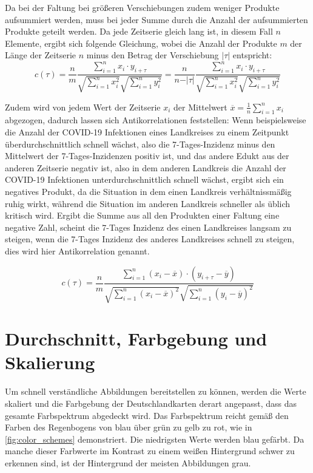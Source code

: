 Da bei der Faltung bei größeren Verschiebungen zudem weniger Produkte aufsummiert werden, muss bei jeder Summe durch die Anzahl der aufsummierten Produkte geteilt werden. Da jede Zeitserie gleich lang ist, in diesem Fall $n$ Elemente, ergibt sich folgende Gleichung, wobei die Anzahl der Produkte $m$ der Länge der Zeitserie $n$ minus den Betrag der Verschiebung $\vert\tau\vert$ entspricht:
\begin{equation}\label{eq:Korrelation}
    c(\tau) =\frac{n}{m} \frac{\sum_{i=1}^n x_i\cdot y_{i+\tau}}{\sqrt{\sum_{i=1}^n x_i^2}\sqrt{\sum_{i=1}^n y_i^2}}=
    \frac{n}{n-\vert\tau\vert} \frac{\sum_{i=1}^n x_i\cdot y_{i+\tau}}{\sqrt{\sum_{i=1}^n x_i^2}\sqrt{\sum_{i=1}^n y_i^2}}
\end{equation}

Zudem wird von jedem Wert der Zeitserie $x_i$ der Mittelwert $\overline x = \frac{1}{n}\sum_{i=1}^n x_i$ abgezogen, dadurch lassen sich Antikorrelationen feststellen: Wenn beispielsweise die Anzahl der COVID-19 Infektionen eines Landkreises zu einem Zeitpunkt überdurchschnittlich schnell wächst, also die 7-Tages-Inzidenz minus den Mittelwert der 7-Tages-Inzidenzen positiv ist, und das andere Edukt aus der anderen Zeitserie negativ ist, also in dem anderen Landkreis die Anzahl der COVID-19 Infektionen unterdurchschnittlich schnell wächst, ergibt sich ein negatives Produkt, da die Situation in dem einen Landkreis verhältnissmäßig ruhig wirkt, während die Situation im anderen Landkreis schneller als üblich kritisch wird. Ergibt die Summe aus all den Produkten einer Faltung eine negative Zahl, scheint die 7-Tages Inzidenz des einen Landkreises langsam zu steigen, wenn die 7-Tages Inzidenz des anderes Landkreises schnell zu steigen, dies wird hier Antikorrelation genannt.

\begin{equation}\label{eq:Korrelation}
    c(\tau) =\frac{n}{m}
    \frac{\sum_{i=1}^n (x_i-\overline x)\cdot (y_{i+\tau}-\overline y)}{\sqrt{\sum_{i=1}^n (x_i-\overline x)^2}\sqrt{\sum_{i=1}^n (y_i-\overline y)^2}}
\end{equation}
\section{Durchschnitt, Farbgebung und Skalierung}\label{sec:Durchschnitt, Farbgebung und Skalierung}
Um schnell verständliche Abbildungen bereitstellen zu können, werden die Werte skaliert und die Farbgebung der Deutschlandkarten derart angepasst, dass das gesamte Farbspektrum abgedeckt wird. Das Farbspektrum reicht gemäß den Farben des Regenbogens von blau über grün zu gelb zu rot, wie in \autoref{fig:color_schemes} demonstriert. Die niedrigsten Werte werden blau gefärbt.
Da manche dieser Farbwerte im Kontrast zu einem weißen Hintergrund schwer zu erkennen sind, ist der Hintergrund der meisten Abbildungen grau.


